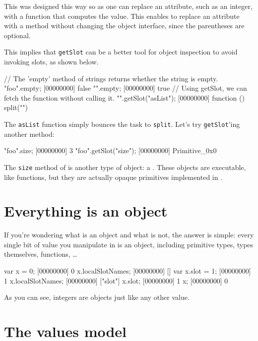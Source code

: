 This was designed this way so as one can replace an attribute, such as
an integer, with a function that computes the value. This enables to
replace an attribute with a method without changing the object
interface, since the parentheses are optional.

This implies that \lstinline|getSlot| can be a better tool for object
inspection to avoid invoking slots, as shown below.

\begin{urbiscript}
// The 'empty' method of strings returns whether the string is empty.
"foo".empty;
[00000000] false
"".empty;
[00000000] true
// Using getSlot, we can fetch the function without calling it.
"".getSlot("asList");
[00000000] function () { split("") }
\end{urbiscript}

The \lstinline|asList| function simply bounces the task to
\lstinline|split|.  Let's try \lstinline{getSlot}'ing another method:

\begin{urbiscript}
"foo".size;
[00000000] 3
"foo".getSlot("size");
[00000000] Primitive_0x0
\end{urbiscript}

The \lstinline{size} method of  is another type of
object: a . These objects are executable, like
functions, but they are actually opaque primitives implemented in
\Cxx.

\section{Everything is an object}

If you're wondering what is an object and what is not, the answer is
simple: every single bit of value you manipulate in \us is an
object, including primitive types, types themselves, functions, \ldots

\begin{urbiscript}
var x = 0;
[00000000] 0
x.localSlotNames;
[00000000] []
var x.slot = 1;
[00000000] 1
x.localSlotNames;
[00000000] ["slot"]
x.slot;
[00000000] 1
x;
[00000000] 0
\end{urbiscript}

As you can see, integers are objects just like any other value.

\section{The \us values model}

